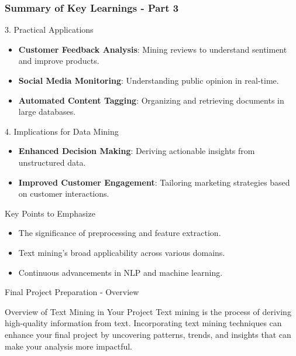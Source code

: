 \documentclass[aspectratio=169]{beamer}
\begin{document}
\begin{frame}[fragile]
    \frametitle{Summary of Key Learnings - Part 3}
    \begin{block}{3. Practical Applications}
        \begin{itemize}
            \item \textbf{Customer Feedback Analysis}: Mining reviews to understand sentiment and improve products.
            \item \textbf{Social Media Monitoring}: Understanding public opinion in real-time.
            \item \textbf{Automated Content Tagging}: Organizing and retrieving documents in large databases.
        \end{itemize}
    \end{block}
    
    \begin{block}{4. Implications for Data Mining}
        \begin{itemize}
            \item \textbf{Enhanced Decision Making}: Deriving actionable insights from unstructured data.
            \item \textbf{Improved Customer Engagement}: Tailoring marketing strategies based on customer interactions.
        \end{itemize}
    \end{block}
    
    \begin{block}{Key Points to Emphasize}
        \begin{itemize}
            \item The significance of preprocessing and feature extraction.
            \item Text mining's broad applicability across various domains.
            \item Continuous advancements in NLP and machine learning. 
        \end{itemize}
    \end{block}
\end{frame}

\begin{frame}[fragile]{Final Project Preparation - Overview}
    \begin{block}{Overview of Text Mining in Your Project}
        Text mining is the process of deriving high-quality information from text. 
        Incorporating text mining techniques can enhance your final project by uncovering patterns, trends, and insights that can make your analysis more impactful.
    \end{block}
\end{frame}
\end{document}
